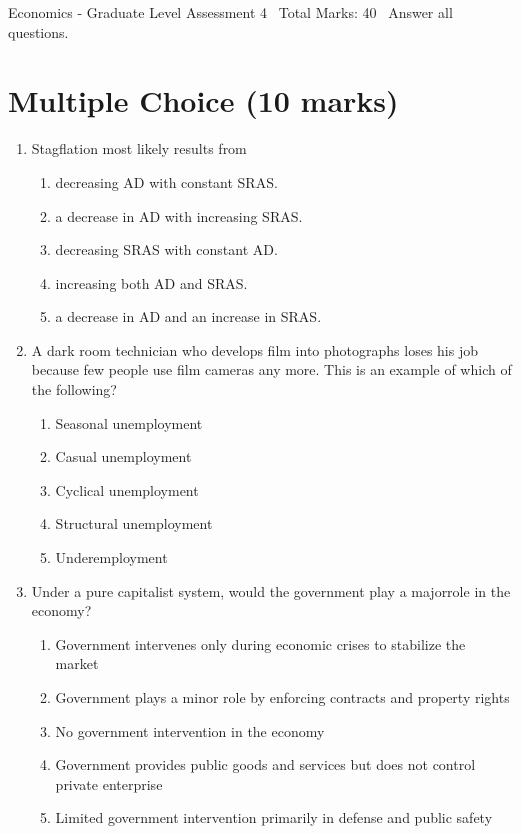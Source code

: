 \documentclass[12pt]{article}
\begin{document}
\begin{center}
Economics - Graduate Level Assessment 4 \
Total Marks: 40 \
Answer all questions.
\end{center}

\section*{Multiple Choice (10 marks)}
\begin{enumerate}[label=\arabic*.]
\item Stagflation most likely results from
\begin{enumerate}[label=(\alph*)]
    \item decreasing AD with constant SRAS.
    \item a decrease in AD with increasing SRAS.
    \item decreasing SRAS with constant AD.
    \item increasing both AD and SRAS.
    \item a decrease in AD and an increase in SRAS.
\end{enumerate}
\item A dark room technician who develops film into photographs loses his job because few people
use film cameras any more. This is an example of which of the following?
\begin{enumerate}[label=(\alph*)]
    \item Seasonal unemployment
    \item Casual unemployment
    \item Cyclical unemployment
    \item Structural unemployment
    \item Underemployment
\end{enumerate}
\item Under a pure capitalist system, would the government play a majorrole in the economy?
\begin{enumerate}[label=(\alph*)]
    \item Government intervenes only during economic crises to stabilize the market
    \item Government plays a minor role by enforcing contracts and property rights
    \item No government intervention in the economy
    \item Government provides public goods and services but does not control private enterprise
    \item Limited government intervention primarily in defense and public safety

\end{enumerate}
\end{enumerate}
\end{document}
